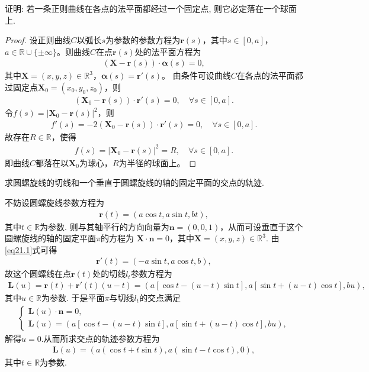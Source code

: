 \documentclass[../../main.tex]{subfiles}%
\begin{document}
\begin{example}
证明: 若一条正则曲线在各点的法平面都经过一个固定点, 则它必定落在一个球面上.
\end{example}
\begin{proof}

设正则曲线$C$以弧长$s$为参数的参数方程为$\bm{r}(s)$，其中$s\in[0,a]$，$a\in\mathbb{R}\cup\{\pm\infty\}$。则曲线$C$在点$\bm{r}(s)$处的法平面方程为
\begin{align*}
(\bm{X}-\bm{r}(s))\cdot\bm{\alpha}(s)=0,
\end{align*}
其中$\bm{X}=(x,y,z)\in\mathbb{R}^3$，$\bm{\alpha}(s)=\bm{r}'(s)$。
由条件可设曲线$C$在各点的法平面都过固定点$\bm{X}_0=(x_0,y_0,z_0)$，则
\begin{align*}
(\bm{X}_0-\bm{r}(s))\cdot\bm{r}'(s)=0,\quad \forall s\in[0,a].
\end{align*}
令$f(s)=|\bm{X}_0-\bm{r}(s)|^2$，则
\begin{align*}
f'(s)=-2(\bm{X}_0-\bm{r}(s))\cdot\bm{r}'(s)=0,\quad \forall s\in[0,a].
\end{align*}
故存在$R\in\mathbb{R}$，使得
\begin{align*}
f(s)=|\bm{X}_0-\bm{r}(s)|^2=R,\quad \forall s\in[0,a].
\end{align*}
即曲线$C$都落在以$\bm{X}_0$为球心，$R$为半径的球面上。

\end{proof}

\begin{example}
求圆螺旋线的切线和一个垂直于圆螺旋线的轴的固定平面的交点的轨迹.
\end{example}
\begin{solution}

不妨设圆螺旋线参数方程为
\begin{align}
\bm{r}(t)=(a\cos t,a\sin t,bt),
\end{align}
其中$t\in\mathbb{R}$为参数.\label{eq21.1}
则与其轴平行的方向向量为$\bm{n}=(0,0,1)$，从而可设垂直于这个圆螺旋线的轴的固定平面$\pi$的方程为
$\bm{X}\cdot\bm{n}=0$，其中$\bm{X}=(x,y,z)\in\mathbb{R}^3$.
由\eqref{eq21.1}式可得
\begin{align*}
\bm{r}'(t)=(-a\sin t,a\cos t,b),
\end{align*}
故这个圆螺线在点$\bm{r}(t)$处的切线$l_t$参数方程为
\begin{align*}
\bm{L}(u)=\bm{r}(t)+\bm{r}'(t)(u-t)=\left(a\left[\cos t-(u-t)\sin t\right],a\left[\sin t+(u-t)\cos t\right],bu\right),
\end{align*}
其中$u\in\mathbb{R}$为参数.
于是平面$\pi$与切线$l_t$的交点满足
\begin{align*}
\begin{cases}
\bm{L}(u)\cdot\bm{n}=0,\\
\bm{L}(u)=\left(a\left[\cos t-(u-t)\sin t\right],a\left[\sin t+(u-t)\cos t\right],bu\right),
\end{cases}
\end{align*}
解得$u=0$.从而所求交点的轨迹参数方程为
\begin{align*}
\bm{L}(u)=\left(a(\cos t+t\sin t),a(\sin t-t\cos t),0\right),
\end{align*}
其中$t\in\mathbb{R}$为参数.

\end{solution}
\end{document}
